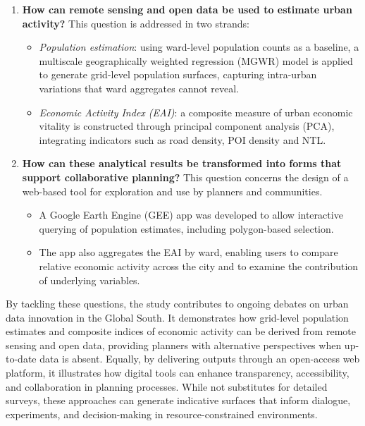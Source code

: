 \documentclass[
  12pt,
  oneside]{book}
\providecommand{\tightlist}{%
  \setlength{\itemsep}{0pt}\setlength{\parskip}{0pt}}
\begin{document}
\begin{enumerate}
\def\labelenumi{\arabic{enumi}.}
\tightlist
\item
  \textbf{How can remote sensing and open data be used to estimate urban activity?}
  This question is addressed in two strands:

  \begin{itemize}
  \tightlist
  \item
    \emph{Population estimation}: using ward-level population counts as a baseline, a multiscale geographically weighted regression (MGWR) model is applied to generate grid-level population surfaces, capturing intra-urban variations that ward aggregates cannot reveal.
  \item
    \emph{Economic Activity Index (EAI)}: a composite measure of urban economic vitality is constructed through principal component analysis (PCA), integrating indicators such as road density, POI density and NTL.
  \end{itemize}
\item
  \textbf{How can these analytical results be transformed into forms that support collaborative planning?}
  This question concerns the design of a web-based tool for exploration and use by planners and communities.

  \begin{itemize}
  \tightlist
  \item
    A Google Earth Engine (GEE) app was developed to allow interactive querying of population estimates, including polygon-based selection.
  \item
    The app also aggregates the EAI by ward, enabling users to compare relative economic activity across the city and to examine the contribution of underlying variables.
  \end{itemize}
\end{enumerate}

By tackling these questions, the study contributes to ongoing debates on urban data innovation in the Global South. It demonstrates how grid-level population estimates and composite indices of economic activity can be derived from remote sensing and open data, providing planners with alternative perspectives when up-to-date data is absent. Equally, by delivering outputs through an open-access web platform, it illustrates how digital tools can enhance transparency, accessibility, and collaboration in planning processes. While not substitutes for detailed surveys, these approaches can generate indicative surfaces that inform dialogue, experiments, and decision-making in resource-constrained environments.
\end{document}
